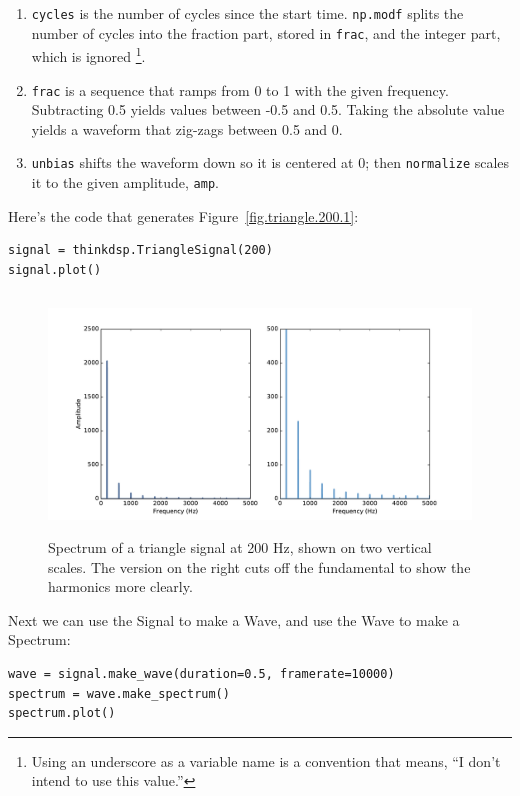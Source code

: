 \documentclass[12pt]{book}
\begin{document}
\begin{enumerate}

\item {\tt cycles} is the number of cycles since the start time.
{\tt np.modf} splits the number of cycles into the fraction
part, stored in {\tt frac}, and the integer part, which is ignored
\footnote{Using an underscore as a variable name is a convention that
means, ``I don't intend to use this value.''}.

\item {\tt frac} is a sequence that ramps from 0 to 1 with the given
  frequency.  Subtracting 0.5 yields values between -0.5 and 0.5.
  Taking the absolute value yields a waveform that zig-zags between
  0.5 and 0.

\item {\tt unbias} shifts the waveform down so it is centered at 0; then
{\tt normalize} scales it to the given amplitude, {\tt amp}.

\end{enumerate}

Here's the code that generates Figure~\ref{fig.triangle.200.1}:

\begin{verbatim}
signal = thinkdsp.TriangleSignal(200)
signal.plot()
\end{verbatim}

\begin{figure}
\centerline{\includegraphics[height=2.5in]{figs/triangle-200-2.pdf}}
\caption{Spectrum of a triangle signal at 200 Hz, shown on two
  vertical scales.  The version on the right cuts off the fundamental
  to show the harmonics more clearly.}
\label{fig.triangle.200.2}
\end{figure}

Next we can use the Signal to make a Wave, and use the Wave to
make a Spectrum:

\begin{verbatim}
wave = signal.make_wave(duration=0.5, framerate=10000)
spectrum = wave.make_spectrum()
spectrum.plot()
\end{verbatim}
\end{document}
